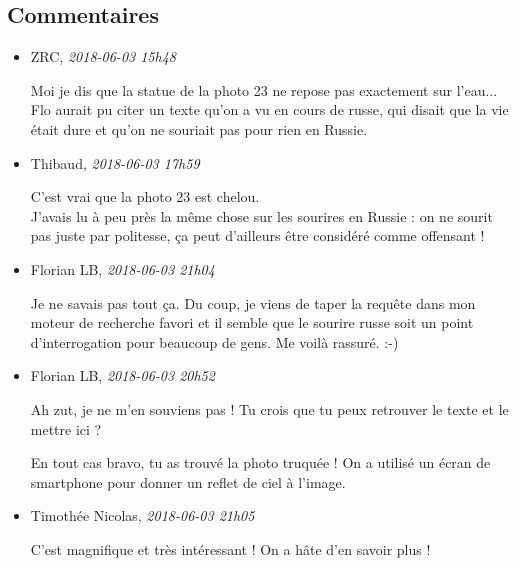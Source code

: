 \documentclass[]{article}
\date{}
\begin{document}
\hypertarget{commentaires}{%
\subsection{Commentaires}\label{commentaires}}

\begin{itemize}
\item
  ZRC, \emph{2018-06-03 15h48}

  Moi je dis que la statue de la photo 23 ne repose pas exactement sur
  l'eau... Flo aurait pu citer un texte qu'on a vu en cours de russe,
  qui disait que la vie était dure et qu'on ne souriait pas pour rien en
  Russie.
\item
  Thibaud, \emph{2018-06-03 17h59}

  C'est vrai que la photo 23 est chelou.\\
  J'avais lu à peu près la même chose sur les sourires en Russie : on ne
  sourit pas juste par politesse, ça peut d'ailleurs être considéré
  comme offensant !
\item
  Florian LB, \emph{2018-06-03 21h04}

  Je ne savais pas tout ça. Du coup, je viens de taper la requête dans
  mon moteur de recherche favori et il semble que le sourire russe soit
  un point d'interrogation pour beaucoup de gens. Me voilà rassuré. :-)
\item
  Florian LB, \emph{2018-06-03 20h52}

  Ah zut, je ne m'en souviens pas ! Tu crois que tu peux retrouver le
  texte et le mettre ici ?

  En tout cas bravo, tu as trouvé la photo truquée ! On a utilisé un
  écran de smartphone pour donner un reflet de ciel à l'image.
\item
  Timothée Nicolas, \emph{2018-06-03 21h05}

  C'est magnifique et très intéressant ! On a hâte d'en savoir plus !
\end{itemize}
\end{document}
